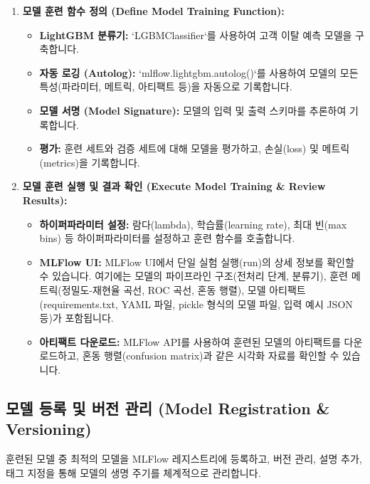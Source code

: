 \documentclass[11pt,a4paper]{article}
\begin{document}
\begin{enumerate}
    \item \textbf{모델 훈련 함수 정의 (Define Model Training Function):}
    \begin{itemize}
        \item \textbf{LightGBM 분류기:} `LGBMClassifier`를 사용하여 고객 이탈 예측 모델을 구축합니다.
        \item \textbf{자동 로깅 (Autolog):} `mlflow.lightgbm.autolog()`를 사용하여 모델의 모든 특성(파라미터, 메트릭, 아티팩트 등)을 자동으로 기록합니다.
        \item \textbf{모델 서명 (Model Signature):} 모델의 입력 및 출력 스키마를 추론하여 기록합니다.
        \item \textbf{평가:} 훈련 세트와 검증 세트에 대해 모델을 평가하고, 손실(loss) 및 메트릭(metrics)을 기록합니다.
    \end{itemize}

    \item \textbf{모델 훈련 실행 및 결과 확인 (Execute Model Training & Review Results):}
    \begin{itemize}
        \item \textbf{하이퍼파라미터 설정:} 람다(lambda), 학습률(learning rate), 최대 빈(max bins) 등 하이퍼파라미터를 설정하고 훈련 함수를 호출합니다.
        \item \textbf{MLFlow UI:} MLFlow UI에서 단일 실험 실행(run)의 상세 정보를 확인할 수 있습니다. 여기에는 모델의 파이프라인 구조(전처리 단계, 분류기), 훈련 메트릭(정밀도-재현율 곡선, ROC 곡선, 혼동 행렬), 모델 아티팩트(requirements.txt, YAML 파일, pickle 형식의 모델 파일, 입력 예시 JSON 등)가 포함됩니다.
        \item \textbf{아티팩트 다운로드:} MLFlow API를 사용하여 훈련된 모델의 아티팩트를 다운로드하고, 혼동 행렬(confusion matrix)과 같은 시각화 자료를 확인할 수 있습니다.
    \end{itemize}
\end{enumerate}

\subsection{모델 등록 및 버전 관리 (Model Registration \& Versioning)}

\begin{summarybox}
훈련된 모델 중 최적의 모델을 MLFlow 레지스트리에 등록하고, 버전 관리, 설명 추가, 태그 지정을 통해 모델의 생명 주기를 체계적으로 관리합니다.
\end{summarybox}
\end{document}
